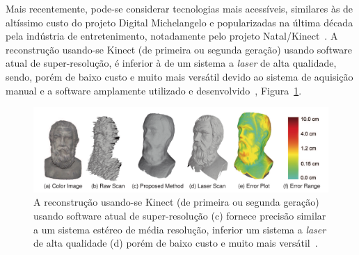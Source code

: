 Mais recentemente, pode-se considerar tecnologias mais acessíveis, similares às
de altíssimo custo do projeto Digital Michelangelo e popularizadas na última
década pela indústria de entretenimento, notadamente pelo projeto
Natal/Kinect~\cite{smisek20133d,wang2015research}. A reconstrução usando-se Kinect (de
primeira ou segunda geração) usando software atual de super-resolução, é
inferior à de um sistema a \emph{laser} de alta qualidade, sendo, porém de baixo custo
e muito mais versátil devido ao sistema de aquisição manual e a software
amplamente utilizado e desenvolvido~\cite{wang2015research},
Figura~\ref{fig:rec3d:comparacao}.


\begin{figure}[!h]
	\centering
	\includegraphics[width=1\linewidth]{figs/kinect-vs-usual.png}
	\caption{%
    A reconstrução usando-se Kinect (de primeira ou segunda geração) usando
    software atual de super-resolução (c) fornece precisão similar a um sistema estéreo de média
    resolução, inferior um sistema a \emph{laser} de alta qualidade (d) porém de baixo custo e
    muito mais versátil~\cite{wang2015research}.
	}\label{fig:rec3d:comparacao}
\end{figure}


